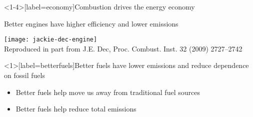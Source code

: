 \documentclass{beamer}
\begin{document}
\maketitle

\begin{frame}<1-4>[label=economy]{Combustion drives the energy economy}
\end{frame}

\begin{frame}{Better engines have higher efficiency and lower emissions}
    \begin{center}
        \texttt{[image: jackie-dec-engine]}\\
        Reproduced in part from J.E. Dec, Proc. Combust. Inst. 32 (2009) 2727--2742
    \end{center}
\end{frame}


\begin{frame}<1>[label=betterfuels]{Better fuels have lower emissions and reduce dependence on fossil fuels}
    \begin{itemize}
        \item<+- | uncover@+> Better fuels help move us away from traditional fuel sources
        \item<visible@+ | uncover@+> Better fuels help reduce total emissions
    \end{itemize}
\end{frame}
\end{document}
